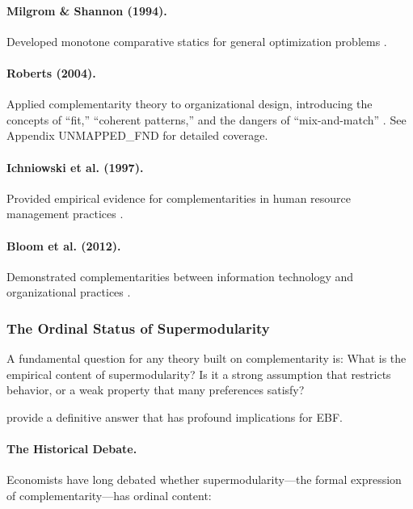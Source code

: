 \paragraph{Milgrom \& Shannon (1994).}
Developed monotone comparative statics for general optimization problems 
\citep{milgromshannon1994}.

\paragraph{Roberts (2004).}
Applied complementarity theory to organizational design, introducing the 
concepts of ``fit,'' ``coherent patterns,'' and the dangers of ``mix-and-match'' 
\citep{roberts2004}. See Appendix UNMAPPED_FND for detailed coverage.

\paragraph{Ichniowski et al. (1997).}
Provided empirical evidence for complementarities in human resource management 
practices \citep{ichniowski1997}.

\paragraph{Bloom et al. (2012).}
Demonstrated complementarities between information technology and organizational 
practices \citep{bloom2012}.



\subsubsection{The Ordinal Status of Supermodularity}
\label{sec:ordinal-status}

A fundamental question for any theory built on complementarity is: 
What is the empirical content of supermodularity? Is it a strong assumption 
that restricts behavior, or a weak property that many preferences satisfy?

\citet{chambers2009supermodularity} provide a definitive answer that has 
profound implications for EBF.

\paragraph{The Historical Debate.}
Economists have long debated whether supermodularity---the formal expression 
of complementarity---has ordinal content:

